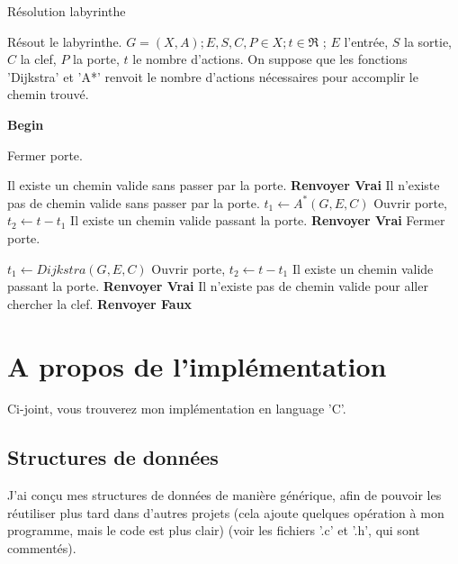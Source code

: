 \documentclass[10pt]{article}
\begin{document}
			\begin{algorithm}
				\caption{Résolution labyrinthe}
				\begin{algorithmic}
					\ENSURE Résout le labyrinthe.
					\REQUIRE $G = (X, A) ; E, S, C, P \in X ; t \in \Re$ ;
							$E$ l'entrée, $S$ la sortie, $C$ la clef, $P$ la porte,
							$t$ le nombre d'actions. On suppose que les fonctions 'Dijkstra' et 'A*' renvoit le nombre
							d'actions nécessaires pour accomplir le chemin trouvé.
					
					\STATE \textbf{Begin}
					
					\STATE Fermer porte.
					
						\PRINT Il existe un chemin valide sans passer par la porte. \textbf{Renvoyer Vrai}
					\ENDIF
					\PRINT Il n'existe pas de chemin valide sans passer par la porte.
					\STATE $t_1 \leftarrow A^*(G, E, C)$
						\STATE Ouvrir porte, $t_2 \leftarrow t - t_1$
							\PRINT Il existe un chemin valide passant la porte. \textbf{Renvoyer Vrai}
						\ENDIF
						\STATE Fermer porte.
					\ENDIF
					
					\STATE $t_1 \leftarrow Dijkstra(G, E, C)$
						\STATE Ouvrir porte, $t_2 \leftarrow t - t_1$
							\PRINT Il existe un chemin valide passant la porte. \textbf{Renvoyer Vrai}
						\ENDIF
					\ENDIF
					\PRINT Il n'existe pas de chemin valide pour aller chercher la clef. \textbf{Renvoyer Faux}

				\end{algorithmic}
			\end{algorithm}

	\section{A propos de l'implémentation}
		Ci-joint, vous trouverez mon implémentation en language 'C'.
		\subsection{Structures de données}
		J'ai conçu mes structures de données de manière générique, afin de pouvoir les réutiliser plus tard dans d'autres projets
		(cela ajoute quelques opération à mon programme, mais le code est plus clair) (voir les fichiers '.c' et '.h', qui sont commentés).
\end{document}
